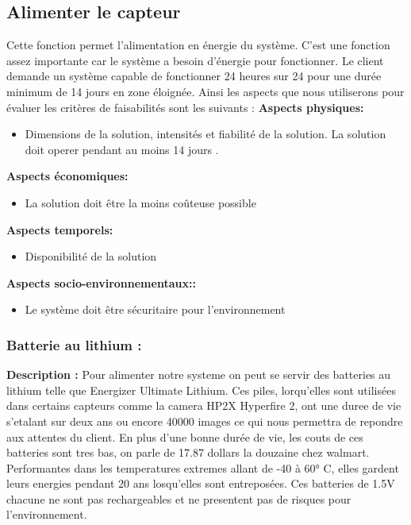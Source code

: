 \subsection{Alimenter le capteur}
 Cette fonction permet l'alimentation en énergie du système. C'est une fonction assez importante car le système a besoin d'énergie pour fonctionner. Le client demande un système capable de fonctionner 24 heures sur 24 pour une durée minimum de 14 jours en zone éloignée. Ainsi les aspects que nous utiliserons pour évaluer les critères de faisabilités sont les suivants : 
 \textbf{Aspects physiques:}
 \begin{itemize} [label = {--}]
    \item Dimensions de la solution, intensités et fiabilité de  la solution. La solution doit operer pendant au moins 14 jours .
\end{itemize}
 \textbf{Aspects économiques:}
 \begin{itemize} [label = {--}]
    \item La solution doit être la moins coûteuse possible
\end{itemize}
 \textbf{Aspects temporels:}
 \begin{itemize} [label = {--}]
    \item Disponibilité de la solution
\end{itemize}
 \textbf{Aspects socio-environnementaux::}
 \begin{itemize} [label = {--}]
    \item Le système doit être sécuritaire pour l'environnement
\end{itemize}
\subsubsection{Batterie au lithium :}

\textbf{Description :}
Pour alimenter notre systeme on peut se servir des batteries au lithium telle que Energizer Ultimate Lithium. Ces piles, lorqu'elles sont utilisées dans certains capteurs comme la camera HP2X Hyperfire 2, ont une duree de vie s'etalant sur deux ans ou encore 40000 images ce qui nous permettra de repondre aux attentes du client. En plus d'une bonne durée de vie, les couts de ces batteries sont tres bas, on parle de 17.87 dollars la douzaine chez walmart. Performantes dans les temperatures extremes allant de -40 à 60° C, elles gardent leurs energies pendant 20 ans losqu'elles sont entreposées. Ces batteries de 1.5V chacune ne sont pas rechargeables et ne presentent pas de risques pour l'environnement.
 
